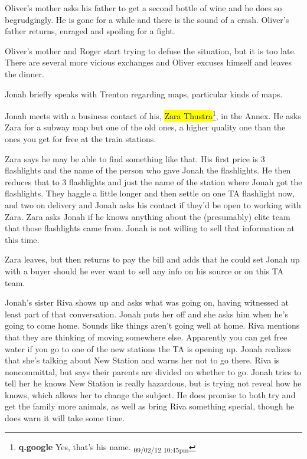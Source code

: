Oliver's mother asks his father to get a second bottle of wine and he does so begrudgingly.  He is gone for a while and there is the sound of a crash.  Oliver's father returns, enraged and spoiling for a fight.



Oliver's mother and Roger start trying to defuse the situation, but it is too late.  There are several more vicious exchanges and Oliver excuses himself and leaves the dinner.



Jonah briefly speaks with Trenton regarding maps, particular kinds of maps.



Jonah meets with a business contact of his, \hl{Zara Thustra}\footnote{\textbf{q.google }Yes, that's his name. \textsubscript{09/02/12 10:45pm}}, in the Annex.  He asks Zara for a subway map but one of the old ones, a higher quality one than the ones you get for free at the train stations.



Zara says he may be able to find something like that.  His first price is 3 flashlights and the name of the person who gave Jonah the flashlights.  He then reduces that to 3 flashlights and just the name of the station where Jonah got the flashlights.  They haggle a little longer and then settle on one TA flashlight now, and two on delivery and Jonah asks his contact if they'd be open to working with Zara.  Zara asks Jonah if he knows anything about the (presumably) elite team that those flashlights came from.  Jonah is not willing to sell that information at this time.



Zara leaves, but then returns to pay the bill and adds that he could set Jonah up with a buyer should he ever want to sell any info on his source or on this TA team.



Jonah's sister Riva shows up and asks what was going on, having witnessed at least part of that conversation.  Jonah puts her off and she asks him when he's going to come home.  Sounds like things aren't going well at home.  Riva mentions that they are thinking of moving somewhere else.  Apparently you can get free water if you go to one of the new stations the TA is opening up.  Jonah realizes that she's talking about New Station and warns her not to go there.  Riva is noncommittal, but says their parents are divided on whether to go.  Jonah tries to tell her he knows New Station is really hazardous, but is trying not reveal how he knows, which allows her to change the subject.  He does promise to both try and get the family more animals, as well as bring Riva something special, though he does warn it will take some time.


